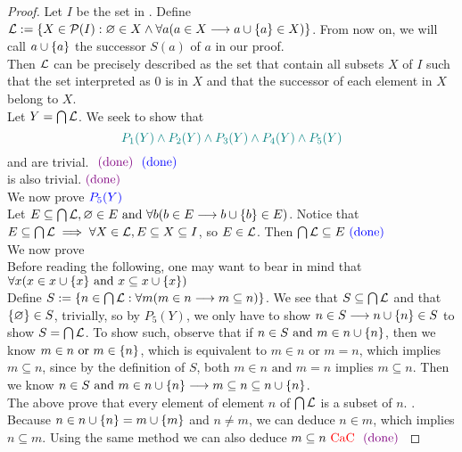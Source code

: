 \documentclass{report}
\begin{document}
\begin{proof}
  Let $I$ be the set in . Define $ \mathcal{L}:=\{ X\in\mathcal{P}(I):\varnothing \in X \land \forall a(a \in X \longrightarrow a\cup \{ a \}\in X) \} $. From now on, we will call $a\cup \{ a \}$ the successor $S(a)$ of $a$ in our proof.\\

Then  $\mathcal{L}$ can be precisely described as the set that contain all subsets $X$ of  $I$ such that the set interpreted as  $0$ is in  $X$ and that the successor of each element in $X$ belong to  $X$.\\

Let $Y=\bigcap \mathcal{L}$. We seek to show that 
\begin{equation}
\textcolor{teal}{P_1(Y)\land P_2(Y) \land P_3(Y) \land P_4(Y)\land P_5(Y)}
\end{equation}
 and  are trivial. $\textcolor{violet}{\text{ (done) }} \textcolor{blue}{\text{ (done) }}$\\

 is also trivial.$\textcolor{violet}{\text{ (done) }}$\\


We now prove $\textcolor{blue}{P_5(Y)}$\\

Let $E \subseteq \bigcap  \mathcal{L},\varnothing\in E\text{ and }\forall b(b\in E\longrightarrow b \cup \{ b \}\in E)$. Notice that $E\subseteq \bigcap \mathcal{L} \implies \forall X\in \mathcal{L} ,E\subseteq X \subseteq I$, so $E\in \mathcal{L} $. Then $\bigcap \mathcal{L} \subseteq E \textcolor{blue}{\text{ (done) }}$\\

We now prove \\

Before reading the following, one may want to bear in mind that $\forall x(x\in x\cup \{ x \}\text{ and }x\subseteq x\cup \{ x \})$ \\

Define $S:=\{ n\in \bigcap \mathcal{L}:\forall m(m \in n \longrightarrow  m\subseteq n)  \}$. We see that $S\subseteq \bigcap \mathcal{L} $ and that $\{ \varnothing \}\in S$, trivially, so by $P_5(Y)$, we only have to show $n \in S \longrightarrow n\cup \{ n \}\in S$ to show $S=\bigcap  \mathcal{L} $. To show such, observe that if $n\in S\text{ and }m \in n \cup \{ n \}$, then we know $m \in n\text{ or }m \in \{ n \}$, which is equivalent to $m \in n \text{ or } m=n$, which implies $m\subseteq n$, since by the definition of $S$, both  $m \in n\text{ and }m=n$ implies $m\subseteq n$. Then we know $n\in S\text{ and }m \in n \cup \{ n \}\longrightarrow  m\subseteq n \subseteq n\cup \{ n \}$.\\

The above prove that every element of element $n$ of  $\bigcap \mathcal{L} $ is a subset of $n$. . Because $n\in n \cup  \{ n \}=m\cup  \{ m \}$ and $n\neq m$, we can deduce $n \in m$, which implies $n\subseteq m$. Using the same method we can also deduce $m \subseteq n\text{ \textcolor{red}{CaC} } \textcolor{violet}{\text{ (done) }}$    
\end{proof}
\end{document}
